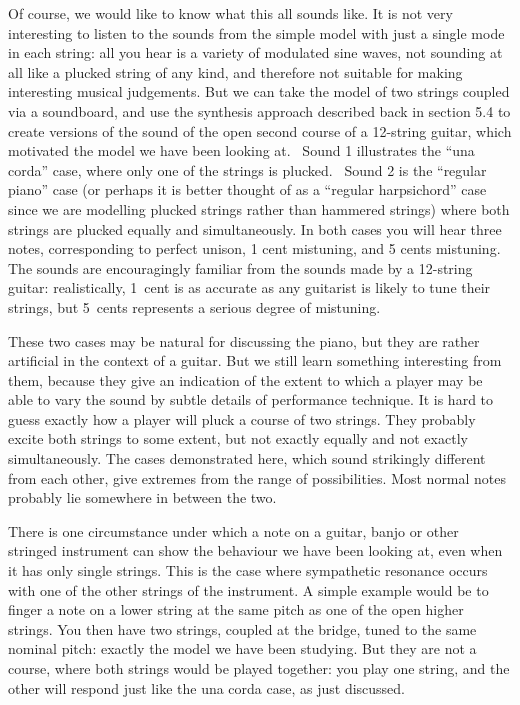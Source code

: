   Of course, we would like to know what this all sounds like. It is not very 
  interesting to listen to the sounds from the simple model with just a single 
  mode in each string: all you hear is a variety of modulated sine waves, not 
  sounding at all like a plucked string of any kind, and therefore not suitable 
  for making interesting musical judgements. But we can take the model of two 
  strings coupled via a soundboard, and use the synthesis approach described 
  back in section 5.4 to create versions of the sound of the open second course 
  of a 12-string guitar, which motivated the model we have been looking at.~ 
  Sound 1 illustrates the “una corda” case, where only one of the strings is 
  plucked.~ Sound 2 is the “regular piano” case (or perhaps it is better 
  thought of as a ``regular harpsichord'' case since we are modelling plucked 
  strings rather than hammered strings) where both strings are plucked equally 
  and simultaneously. In both cases you will hear three notes, corresponding to 
  perfect unison, 1 cent mistuning, and 5 cents mistuning. The sounds are 
  encouragingly familiar from the sounds made by a 12-string guitar: 
  realistically, 1~cent is as accurate as any guitarist is likely to tune their 
  strings, but 5~cents represents a serious degree of mistuning. 

  These two cases may be natural for discussing the piano, but they are rather 
  artificial in the context of a guitar. But we still learn something 
  interesting from them, because they give an indication of the extent to which 
  a player may be able to vary the sound by subtle details of performance 
  technique. It is hard to guess exactly how a player will pluck a course of 
  two strings. They probably excite both strings to some extent, but not 
  exactly equally and not exactly simultaneously. The cases demonstrated here, 
  which sound strikingly different from each other, give extremes from the 
  range of possibilities. Most normal notes probably lie somewhere in between 
  the two. 

  There is one circumstance under which a note on a guitar, banjo or other 
  stringed instrument can show the behaviour we have been looking at, even when 
  it has only single strings. This is the case where sympathetic resonance 
  occurs with one of the other strings of the instrument. A simple example 
  would be to finger a note on a lower string at the same pitch as one of the 
  open higher strings. You then have two strings, coupled at the bridge, tuned 
  to the same nominal pitch: exactly the model we have been studying. But they 
  are not a course, where both strings would be played together: you play one 
  string, and the other will respond just like the una corda case, as just 
  discussed. 

